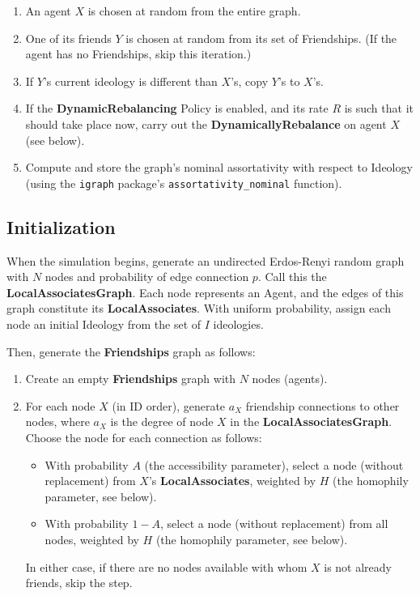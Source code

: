 \begin{enumerate}
\itemsep.1em
\item An agent $X$ is chosen at random from the entire graph.
\item One of its friends $Y$ is chosen at random from its set of Friendships.
(If the agent has no Friendships, skip this iteration.)
\item If $Y$'s current ideology is different than $X$'s, copy $Y$'s to $X$'s.
\item If the \textbf{DynamicRebalancing} Policy is enabled, and its rate $R$
is such that it should take place now, carry out the
\textbf{DynamicallyRebalance} on agent $X$ (see below).
\item Compute and store the graph's nominal assortativity with respect to
Ideology (using the \texttt{igraph} package's \texttt{assortativity\_nominal}
function\cite{csardi_igraph_2006}).
\end{enumerate}


\subsection{Initialization}

When the simulation begins, generate an undirected Erdos-Renyi random
graph\cite{erdos_evolution_1960} with $N$ nodes and probability of edge
connection $p$. Call this the \textbf{LocalAssociatesGraph}. Each node
represents an Agent, and the edges of this graph constitute its
\textbf{LocalAssociates}. With uniform probability, assign each node an
initial Ideology from the set of $I$ ideologies.

Then, generate the \textbf{Friendships} graph as follows:

\begin{enumerate}
\item Create an empty \textbf{Friendships} graph with $N$ nodes (agents).
\item For each node $X$ (in ID order), generate $a_X$ friendship connections
to other nodes, where $a_X$ is the degree of node $X$ in the
\textbf{LocalAssociatesGraph}. Choose the node for each connection as follows:
    \begin{itemize}
    \item With probability $A$ (the accessibility parameter), select a node
(without replacement) from $X$'s \textbf{LocalAssociates}, weighted by $H$
(the homophily parameter, see below).
    \item With probability $1-A$, select a node (without replacement) from all
nodes, weighted by $H$ (the homophily parameter, see below).
    \end{itemize}
    In either case, if there are no nodes available with whom $X$ is not
already friends, skip the step.
\end{enumerate}

